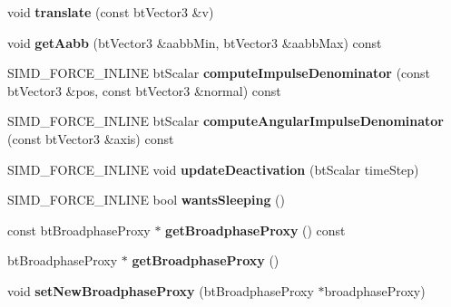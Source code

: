 \begin{DoxyCompactItemize}
\item 
\hypertarget{classbt_rigid_body_aca945f8e257b617c5600e809f179a0bb}{void {\bfseries translate} (const bt\+Vector3 \&v)}\label{classbt_rigid_body_aca945f8e257b617c5600e809f179a0bb}

\item 
\hypertarget{classbt_rigid_body_ab492b584610a853a1dbe68b53031e6ed}{void {\bfseries get\+Aabb} (bt\+Vector3 \&aabb\+Min, bt\+Vector3 \&aabb\+Max) const }\label{classbt_rigid_body_ab492b584610a853a1dbe68b53031e6ed}

\item 
\hypertarget{classbt_rigid_body_a8b58233f3720b389d32d37f4e12cbd23}{S\+I\+M\+D\+\_\+\+F\+O\+R\+C\+E\+\_\+\+I\+N\+L\+I\+N\+E bt\+Scalar {\bfseries compute\+Impulse\+Denominator} (const bt\+Vector3 \&pos, const bt\+Vector3 \&normal) const }\label{classbt_rigid_body_a8b58233f3720b389d32d37f4e12cbd23}

\item 
\hypertarget{classbt_rigid_body_a5f0d52514a70e7e010a055e9aab742b0}{S\+I\+M\+D\+\_\+\+F\+O\+R\+C\+E\+\_\+\+I\+N\+L\+I\+N\+E bt\+Scalar {\bfseries compute\+Angular\+Impulse\+Denominator} (const bt\+Vector3 \&axis) const }\label{classbt_rigid_body_a5f0d52514a70e7e010a055e9aab742b0}

\item 
\hypertarget{classbt_rigid_body_aa48bf2e5bf090c613ad8e9aa605bc7df}{S\+I\+M\+D\+\_\+\+F\+O\+R\+C\+E\+\_\+\+I\+N\+L\+I\+N\+E void {\bfseries update\+Deactivation} (bt\+Scalar time\+Step)}\label{classbt_rigid_body_aa48bf2e5bf090c613ad8e9aa605bc7df}

\item 
\hypertarget{classbt_rigid_body_aa2ccbd4474fe0edef483533943b5d666}{S\+I\+M\+D\+\_\+\+F\+O\+R\+C\+E\+\_\+\+I\+N\+L\+I\+N\+E bool {\bfseries wants\+Sleeping} ()}\label{classbt_rigid_body_aa2ccbd4474fe0edef483533943b5d666}

\item 
\hypertarget{classbt_rigid_body_a5a991c9cea3efa5c2854bbf6da35aaf5}{const bt\+Broadphase\+Proxy $\ast$ {\bfseries get\+Broadphase\+Proxy} () const }\label{classbt_rigid_body_a5a991c9cea3efa5c2854bbf6da35aaf5}

\item 
\hypertarget{classbt_rigid_body_a505e4a8179302137cb72f47595404e89}{bt\+Broadphase\+Proxy $\ast$ {\bfseries get\+Broadphase\+Proxy} ()}\label{classbt_rigid_body_a505e4a8179302137cb72f47595404e89}

\item 
\hypertarget{classbt_rigid_body_a254399995032d1120492e419f588b28c}{void {\bfseries set\+New\+Broadphase\+Proxy} (bt\+Broadphase\+Proxy $\ast$broadphase\+Proxy)}\label{classbt_rigid_body_a254399995032d1120492e419f588b28c}


\end{DoxyCompactItemize}
